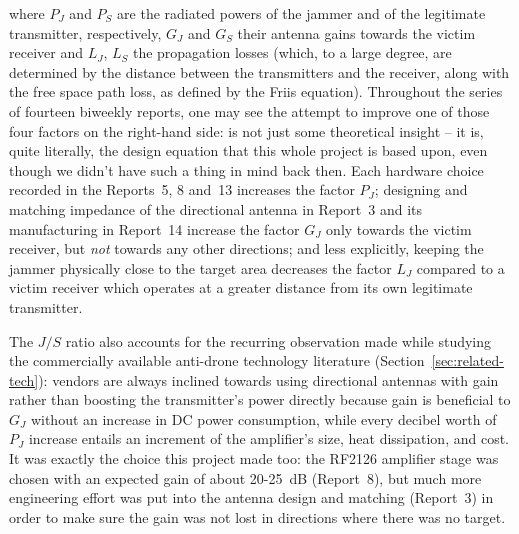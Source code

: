 \documentclass[12pt,a4paper]{report}
\begin{document}
	\vspace{0.5cm}
	
	where $P_J$ and $P_S$ are the radiated powers of the jammer and of the legitimate transmitter, respectively, $G_J$ and $G_S$ their antenna gains towards the victim receiver and $L_J$, $L_S$ the propagation losses (which, to a large degree, are determined by the distance between the transmitters and the receiver, along with the free space path loss, as defined by the Friis equation). Throughout the series of fourteen biweekly reports, one may see the attempt to improve one of those four factors on the right-hand side: is not just some theoretical insight -- it is, quite literally, the design equation that this whole project is based upon, even though we didn't have such a thing in mind back then. Each hardware choice recorded in the Reports~5, 8 and~13 increases the factor $P_J$; designing and matching impedance of the directional antenna in Report~3 and its manufacturing in Report~14 increase the factor $G_J$ only towards the victim receiver, but \emph{not} towards any other directions; and less explicitly, keeping the jammer physically close to the target area decreases the factor $L_J$ compared to a victim receiver which operates at a greater distance from its own legitimate transmitter.
	
	\vspace{0.5cm}
	
	The $J/S$ ratio also accounts for the recurring observation made while studying the commercially available anti-drone technology literature (Section~\ref{sec:related-tech}): vendors are always inclined towards using directional antennas with gain rather than boosting the transmitter's power directly because gain is beneficial to $G_J$ without an increase in DC power consumption, while every decibel worth of $P_J$ increase entails an increment of the amplifier's size, heat dissipation, and cost. It was exactly the choice this project made too: the RF2126 amplifier stage was chosen with an expected gain of about 20-25~dB (Report~8), but much more engineering effort was put into the antenna design and matching (Report~3) in order to make sure the gain was not lost in directions where there was no target.
	
	\vspace{0.5cm}
	
\end{document}

